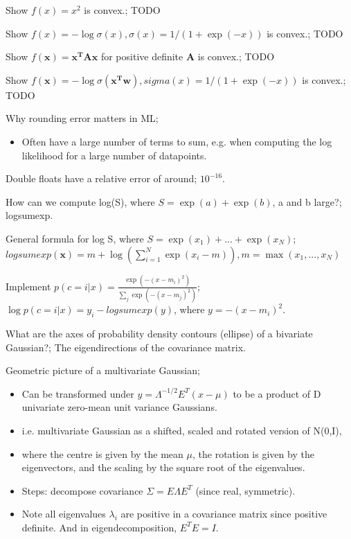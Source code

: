 \documentclass{article}
\begin{document}
Show $f(x)=x^2$ is convex.; TODO

Show $f(x) = -\log \sigma(x), \sigma(x)=1/(1+\exp(-x))$ is convex.; TODO

Show $f(\mathbf{x}) = \mathbf{x^TAx}$ for positive definite $\mathbf{A}$ is convex.; TODO

Show $f(\mathbf{x}) = -\log\sigma(\mathbf{x^Tw}),sigma(x)=1/(1+\exp(-x))$ is convex.; TODO 

Why rounding error matters in ML; \begin{itemize} \item Often have a large number of terms to sum, e.g. when computing the log likelihood for a large number of datapoints. \end{itemize}

Double floats have a relative error of around; $10^{-16}$.

How can we compute log(S), where $S=\exp(a)+\exp(b)$, a and b large?; logsumexp. 

General formula for log S, where $S=\exp(x_1)+...+\exp(x_N)$; $logsumexp()=m+\log(\sum_{i=1}^N\exp(x_i-m)), m=\max(x_1,...,x_N)$

Implement $p(c=i|x)=$; $\log p(c=i|x) = y_i - logsumexp(y)$, where $y=-(x - m_i)^2$.

What are the axes of probability density contours (ellipse) of a bivariate Gaussian?; The eigendirections of the covariance matrix.

Geometric picture of a multivariate Gaussian; \begin{itemize} \item Can be transformed under $y=\Lambda^{-1/2}E^T(x-\mu)$ to be a product of D univariate zero-mean unit variance Gaussians. \item i.e. multivariate Gaussian as a shifted, scaled and rotated version of N(0,I),  \item where the centre is given by the mean $\mu$, the rotation is given by the eigenvectors, and the scaling by the square root of the eigenvalues. \item Steps: decompose covariance $\Sigma = E\Lambda E^T$ (since real, symmetric).  \item Note all eigenvalues $\lambda_i$ are positive in a covariance matrix since positive definite. And in eigendecomposition, $E^TE=I$. \end{itemize}
\end{document}
